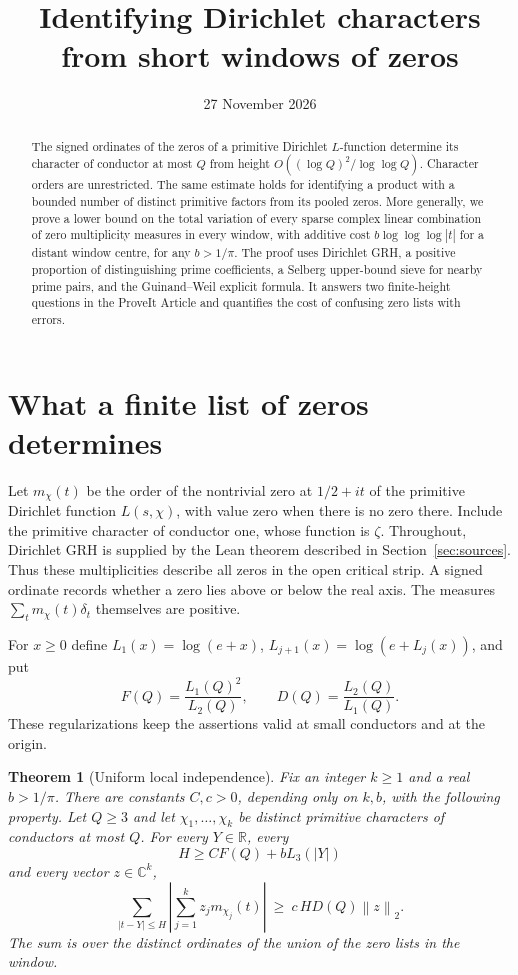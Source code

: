 \documentclass[11pt]{article}
\title{Identifying Dirichlet characters from short windows of zeros}
\author{}\date{27 November 2026}
\newtheorem{theorem}{Theorem}
\newcommand{\R}{\mathbb R}\newcommand{\C}{\mathbb C}
\newcommand{\norm}[1]{\left\lVert #1\right\rVert}
\newcommand{\abs}[1]{\left\lvert #1\right\rvert}
\begin{document}
\maketitle
\begin{abstract}
The signed ordinates of the zeros of a primitive Dirichlet $L$-function determine its character of conductor at most $Q$ from height $O((\log Q)^2/\log\log Q)$. Character orders are unrestricted. The same estimate holds for identifying a product with a bounded number of distinct primitive factors from its pooled zeros. More generally, we prove a lower bound on the total variation of every sparse complex linear combination of zero multiplicity measures in every window, with additive cost $b\log\log\log|t|$ for a distant window centre, for any $b>1/\pi$. The proof uses Dirichlet GRH, a positive proportion of distinguishing prime coefficients, a Selberg upper-bound sieve for nearby prime pairs, and the Guinand--Weil explicit formula. It answers two finite-height questions in the ProveIt Article and quantifies the cost of confusing zero lists with errors.
\end{abstract}

\section{What a finite list of zeros determines}
Let $m_\chi(t)$ be the order of the nontrivial zero at $1/2+it$ of the primitive Dirichlet function $L(s,\chi)$, with value zero when there is no zero there. Include the primitive character of conductor one, whose function is $\zeta$. Throughout, Dirichlet GRH is supplied by the Lean theorem described in Section~\ref{sec:sources}. Thus these multiplicities describe all zeros in the open critical strip. A signed ordinate records whether a zero lies above or below the real axis. The measures $\sum_t m_\chi(t)\delta_t$ themselves are positive.

For $x\ge0$ define $L_1(x)=\log(e+x)$, $L_{j+1}(x)=\log(e+L_j(x))$, and put
\[
 F(Q)=\frac{L_1(Q)^2}{L_2(Q)},\qquad D(Q)=\frac{L_2(Q)}{L_1(Q)}.
\]
These regularizations keep the assertions valid at small conductors and at the origin.

\begin{theorem}[Uniform local independence]\label{th:main}
Fix an integer $k\ge1$ and a real $b>1/\pi$. There are constants $C,c>0$, depending only on $k,b$, with the following property.
Let $Q\ge3$ and let $\chi_1,\dots,\chi_k$ be distinct primitive characters of conductors at most $Q$. For every $Y\in\R$, every
\begin{equation}\label{eq:window}
 H\ge C F(Q)+bL_3(|Y|)
\end{equation}
and every vector $z\in\C^k$,
\begin{equation}\label{eq:mass}
 \sum_{|t-Y|\le H}\abs{\sum_{j=1}^k z_jm_{\chi_j}(t)}
 \ \ge\ c\,H D(Q)\norm{z}_2 .
\end{equation}
The sum is over the distinct ordinates of the union of the zero lists in the window.
\end{theorem}
\end{document}
